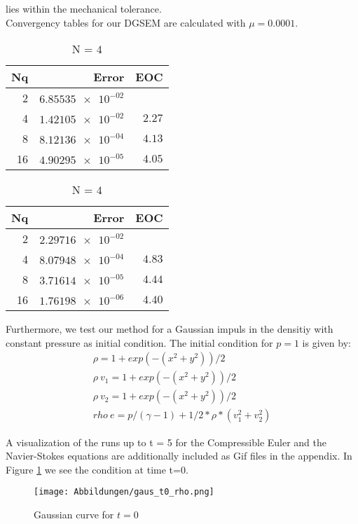 \documentclass[11pt]{scrartcl}
\begin{document}
lies within the mechanical tolerance.\\

Convergency tables for our DGSEM are calculated with $\mu=0.0001$.

\begin{table}[H]
\parbox{.45\linewidth}{
\centering
    \begin{tabular}{|r|r|r|}
    \hline\hline
    \textbf{Nq} & \textbf{Error} & \textbf{EOC} \\\hline
    2 & $\num{6.85535e-02}$ &  \\
    4 & $\num{1.42105e-02}$ & $\num{2.27}$ \\
    8 & $\num{8.12136e-04}$ & $\num{4.13}$ \\
    16 & $\num{4.90295e-05}$ & $\num{4.05}$ \\\hline\hline
  \end{tabular} 
  \caption{N = $3$}
  }
  \hspace{0.5cm}
  \parbox{.45\linewidth}{
	\centering
    \begin{tabular}{|r|r|r|}
    \hline\hline
    \textbf{Nq} & \textbf{Error} & \textbf{EOC} \\\hline
    2 & $\num{2.29716e-02}$ &  \\
    4 & $\num{8.07948e-04}$ & $\num{4.83}$ \\
    8 & $\num{3.71614e-05}$ & $\num{4.44}$ \\
    16 & $\num{1.76198e-06}$ & $\num{4.40}$ \\\hline\hline
  \end{tabular}
   \caption{N = $4$}
  }
\end{table}

Furthermore, we test our method for a Gaussian impuls in the densitiy with constant pressure as initial condition.
The initial condition for $p=1$ is given by:
\begin{align*}
	\rho = 1 + exp(-(x^2 + y^2)) / 2 \\
	\rho \ v_1 = 1 + exp(-(x^2 + y^2)) / 2 \\
	\rho \ v_2 = 1 + exp(-(x^2 + y^2)) / 2 \\
	rho \ e = p / (\gamma - 1) + 1 / 2 * \rho * (v_1^2 + v_2^2)
\end{align*}

A visualization of the runs up to t = 5 for the Compressible Euler and the Navier-Stokes equations are additionally included as Gif files in the appendix. 
In Figure \ref{gaust0} we see the condition at time t=0.
\begin{figure}[H]
	\centering
	\texttt{[image: Abbildungen/gaus\_t0\_rho.png]}
	\caption{Gaussian curve for $t=0$}
	\label{gaust0}
\end{figure}
\end{document}
